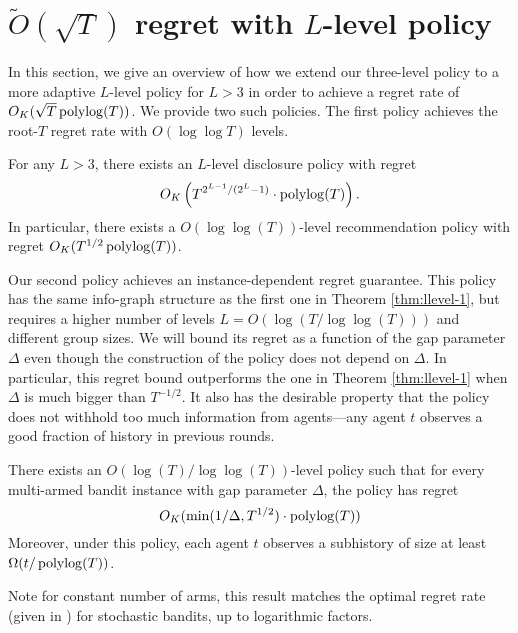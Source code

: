 
\section{$\tilde O(\sqrt{T})$ regret with $L$-level policy}
\label{sec:llevel}
In this section, we give an overview of how we extend our three-level
policy to a more adaptive $L$-level policy for $L > 3$ in order to
achieve a regret rate of $O_K(\sqrt{T} \polylog(T))$. We provide two
such policies. The first policy achieves the root-$T$ regret rate with
$O(\log \log T)$ levels.

\begin{theorem}
\label{thm:llevel-1}
For any $L > 3$, there exists an $L$-level disclosure policy with
regret $$O_K\left(T^{2^{L-1}/(2^L-1)} \cdot \polylog(T) \right).$$ In
particular, there exists a $O(\log\log(T))$-level recommendation
policy with regret $O_K(T^{1/2} \polylog(T))$.
\end{theorem}

Our second policy achieves an instance-dependent regret
guarantee. This policy has the same info-graph structure as the first
one in Theorem \ref{thm:llevel-1}, but requires a higher number of
levels $L = O(\log(T/\log\log(T)))$ and different group sizes. We will
bound its regret as a function of the gap parameter $\Delta$ even
though the construction of the policy does not depend on $\Delta$. In
particular, this regret bound outperforms the one in Theorem
\ref{thm:llevel-1} when $\Delta$ is much bigger than $T^{-1/2}$.  It
also has the desirable property that the policy does not withhold too
much information from agents---any agent $t$ observes a good fraction
of history in previous rounds.

\begin{theorem}
\label{thm:llevel-2}
There exists an $O(\log(T)/\log\log(T))$-level policy such that for
every multi-armed bandit instance with gap parameter $\Delta$, the
policy has regret $$O_K(\min(1/\Delta, T^{1/2}) \cdot \polylog(T))$$
Moreover, under this policy, each agent $t$ observes a subhistory of
size at least $\Omega( t/\polylog(T))$.
\end{theorem}

Note for constant number of arms, this result matches the optimal
regret rate (given in ) for stochastic
bandits, up to logarithmic factors.


